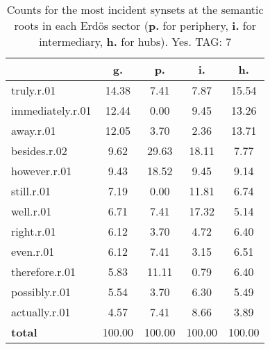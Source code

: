 \begin{table}[h!]
\begin{center}
\begin{tabular}{| l | c | c | c | c |}\hline
 & g. & p. & i. & h. \\\hline
truly.r.01 & 14.38  & 7.41  & 7.87  & 15.54 \\\hline
immediately.r.01 & 12.44  & 0.00  & 9.45  & 13.26 \\\hline
away.r.01 & 12.05  & 3.70  & 2.36  & 13.71 \\\hline
besides.r.02 & 9.62  & 29.63  & 18.11  & 7.77 \\\hline
however.r.01 & 9.43  & 18.52  & 9.45  & 9.14 \\\hline
still.r.01 & 7.19  & 0.00  & 11.81  & 6.74 \\\hline
well.r.01 & 6.71  & 7.41  & 17.32  & 5.14 \\\hline
right.r.01 & 6.12  & 3.70  & 4.72  & 6.40 \\\hline
even.r.01 & 6.12  & 7.41  & 3.15  & 6.51 \\\hline
therefore.r.01 & 5.83  & 11.11  & 0.79  & 6.40 \\\hline
possibly.r.01 & 5.54  & 3.70  & 6.30  & 5.49 \\\hline
actually.r.01 & 4.57  & 7.41  & 8.66  & 3.89 \\\hline
{{\bf total}} & 100.00  & 100.00  & 100.00  & 100.00 \\\hline
\end{tabular}
\caption{Counts for the most incident synsets at the semantic roots in each Erd\"os sector ({\bf p.} for periphery, {\bf i.} for intermediary, {\bf h.} for hubs). Yes. TAG: 7}
\end{center}
\end{table}